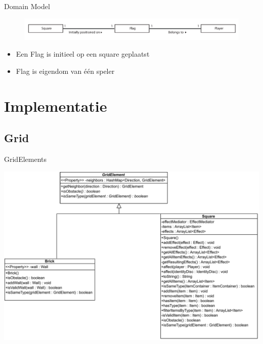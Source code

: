\documentclass[11pt,t]{beamer}
\begin{document}
\begin{frame}{Domain Model}
\begin{center}
\vspace{0.9in}
\begin{figure}
\includegraphics[width=1\linewidth]{images/domainmodel3}
\end{figure}
\end{center}
\begin{itemize}
\item Een Flag is initieel op een square geplaatst 
\item Flag is eigendom van \'{e}\'{e}n speler
\end{itemize}
\end{frame}

\section{Implementatie}

\subsection{Grid}

\begin{frame}{GridElements}
\begin{center}
\includegraphics[scale=0.35]{images/gridelements}
\end{center}
\end{frame}
\end{document}
